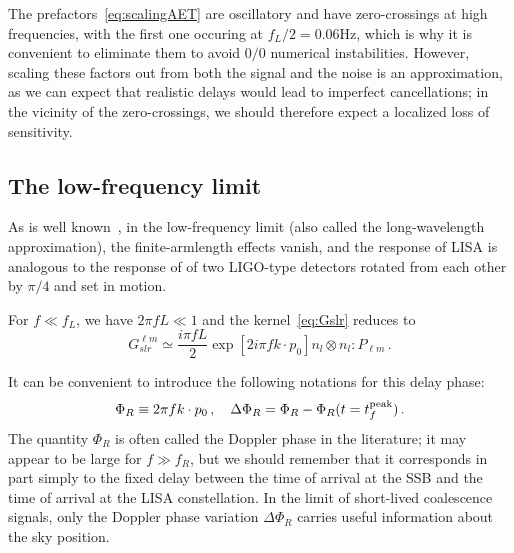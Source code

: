 \documentclass[aps,showpacs,twocolumn,prd,superscriptaddress,nofootinbib]{revtex4-1}
\newcommand{\be}{\begin{equation}}
\newcommand{\ee}{\end{equation}}
\begin{document}
The prefactors~\eqref{eq:scalingAET} are oscillatory and have zero-crossings at high frequencies, with the first one occuring at $f_{L}/2 = 0.06 \mathrm{Hz}$, which is why it is convenient to eliminate them to avoid $0/0$ numerical instabilities. However, scaling these factors out from both the signal and the noise is an approximation, as we can expect that realistic delays would lead to imperfect cancellations; in the vicinity of the zero-crossings, we should therefore expect a localized loss of sensitivity.


\subsection{The low-frequency limit}
\label{subsec:lowfresponse}

As is well known~\cite{Cutler97}, in the low-frequency limit (also called the long-wavelength approximation), the finite-armlength effects vanish, and the response of LISA is analogous to the response of of two LIGO-type detectors  rotated from each other by $\pi/4$ and set in motion.

For $f \ll f_{L}$, we have $2\pi f L \ll 1$ and the kernel~\eqref{eq:Gslr} reduces to
\be\label{eq:Gslrlowf}
	G^{\ell m}_{slr} \simeq \frac{i \pi f L}{2} \exp\left[ 2 i \pi f k\cdot p_{0} \right] n_{l} \otimes n_{l} : P_{\ell m}\,.
\ee

It can be convenient to introduce the following notations for this delay phase:
\be\label{eq:defPhiR}
	\Phi_{R} \equiv 2 \pi f k\cdot p_{0} \,, \quad \Delta \Phi_{R} = \Phi_{R} - \Phi_{R}(t=t_{f}^{\rm peak}) \,.
\ee
The quantity $\Phi_{R}$ is often called the Doppler phase in the literature; it may appear to be large for $f \gg f_{R}$, but we should remember that it corresponds in part simply to the fixed delay between the time of arrival at the SSB and the time of arrival at the LISA constellation. In the limit of short-lived coalescence signals, only the Doppler phase variation $\Delta \Phi_{R}$ carries useful information about the sky position.
\end{document}
